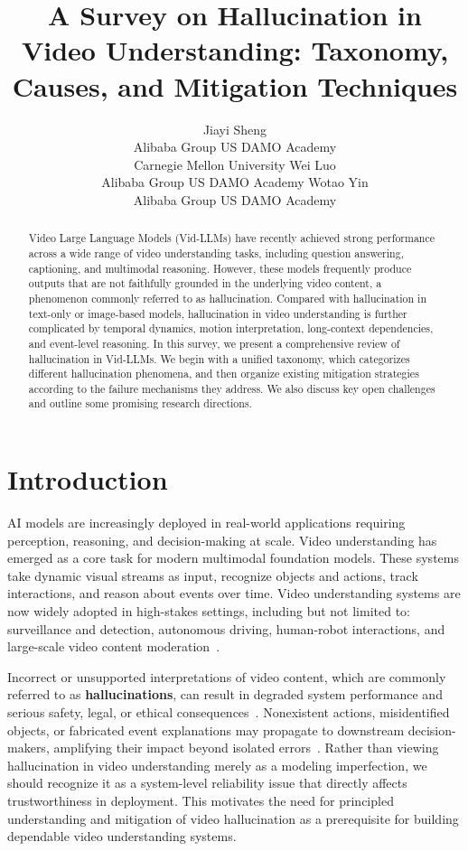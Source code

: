 \documentclass[10pt]{article} %
\title{A Survey on Hallucination in Video Understanding: Taxonomy, Causes, and Mitigation Techniques}
\author{\name Jiayi Sheng \email{jiayisheng@cmu.edu} \\
      \addr Alibaba Group US DAMO Academy\\
      \addr Carnegie Mellon University
      \AND
      \name Wei Luo \email{jinhai.lw@alibaba-inc.com} \\
      \addr Alibaba Group US DAMO Academy
      \AND
      \name Wotao Yin \email{wotao.yin@alibaba-inc.com}\\
      \addr Alibaba Group US DAMO Academy
      }
\begin{document}
\maketitle

\begin{abstract}

Video Large Language Models (Vid-LLMs) have recently achieved strong performance across a wide range of video understanding tasks, including question answering, captioning, and multimodal reasoning. However, these models frequently produce outputs that are not faithfully grounded in the underlying video content, a phenomenon commonly referred to as hallucination. Compared with hallucination in text-only or image-based models, hallucination in video understanding is further complicated by temporal dynamics, motion interpretation, long-context dependencies, and event-level reasoning. In this survey, we present a comprehensive review of hallucination in Vid-LLMs. We begin with a unified taxonomy, which categorizes different hallucination phenomena, and then organize existing mitigation strategies according to the failure mechanisms they address. We also discuss key open challenges and outline some promising research directions.

\end{abstract}

\section{Introduction}\label{sec:intro}

AI models are increasingly deployed in real-world applications requiring perception, reasoning, and decision-making at scale. Video understanding has emerged as a core task for modern multimodal foundation models. These systems take dynamic visual streams as input, recognize objects and actions, track interactions, and reason about events over time. Video understanding systems are now widely adopted in high-stakes settings, including but not limited to: surveillance and detection, autonomous driving, human-robot interactions, and large-scale video content moderation~\citep{chen2024end, eze2025learning, wang2025filter}.

Incorrect or unsupported interpretations of video content, which are commonly referred to as \textbf{hallucinations}, can result in degraded system performance and serious safety, legal, or ethical consequences~\citep{wang2025safevid}. Nonexistent actions, misidentified objects, or fabricated event explanations may propagate to downstream decision-makers, amplifying their impact beyond isolated errors~\citep{wang2025understanding}. Rather than viewing hallucination in video understanding merely as a modeling imperfection, we should recognize it as a system-level reliability issue that directly affects trustworthiness in deployment. This motivates the need for principled understanding and mitigation of video hallucination as a prerequisite for building dependable video understanding systems.
\end{document}
